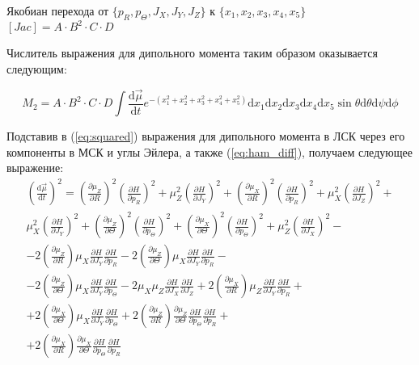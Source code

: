 Якобиан перехода от $\{p_R,p_{\Theta},J_X, J_Y, J_Z  \}$ к $\{x_1, x_2, x_3, x_4, x_5 \}$ $[Jac]=A\cdot B^2 \cdot C \cdot D$

Числитель выражения для дипольного момента таким образом оказывается следующим:

\begin{equation}
\label{eq:mom_sphere}
M_2 =  A\cdot B^2 \cdot C \cdot D {\int \frac{\mathrm{d}\vec\mu}{\mathrm{d} t} e^{-(x_1^2+x_2^2+x_3^2+x_4^2+x_5^2)} \mathrm{d}x_1 \mathrm{d}x_2 \mathrm{d}x_3 \mathrm{d}x_4 \mathrm{d}x_5  \sin\theta \mathrm{d}\theta \mathrm{d}\psi \mathrm{d}\phi}
\end{equation}

Подставив в (\ref{eq:squared}) выражения для дипольного момента в ЛСК через его компоненты в МСК и углы Эйлера, а также (\ref{eq:ham_diff}), получаем следующее выражение:
\begin{equation*}
\begin{aligned}
\left(\frac{\mathrm{d}\vec\mu}{\mathrm{d} t}\right)^2=\left( \frac{\partial \mu_Z}{\partial R}  \right)^2\left( \frac{\partial H}{\partial p_R}  \right)^2 +
\mu_Z^2\left( \frac{\partial H}{\partial J_Y}  \right)^2 +
\left( \frac{\partial \mu_X}{\partial R}  \right)^2\left( \frac{\partial H}{\partial p_R}  \right)^2 +
\mu_X^2\left( \frac{\partial H}{\partial J_Z}  \right)^2 + \\
\mu_X^2\left( \frac{\partial H}{\partial J_Y}  \right)^2 + 
 \left( \frac{\partial \mu_Z}{\partial \Theta}  \right)^2\left( \frac{\partial H}{\partial p_{\Theta}}  \right)^2 +
\left( \frac{\partial \mu_X}{\partial \Theta}  \right)^2\left( \frac{\partial H}{\partial p_{\Theta}}  \right)^2 +
\mu_Z^2\left( \frac{\partial H}{\partial J_X}  \right)^2 - \\
- 2\left( \frac{\partial \mu_Z}{\partial R}  \right)\mu_X\frac{\partial H}{\partial J_Y}\frac{\partial H}{\partial p_R}  -
2\left( \frac{\partial \mu_Z}{\partial \Theta}  \right)\mu_X\frac{\partial H}{\partial J_Y}\frac{\partial H}{\partial p_R} - \\
- 2\left( \frac{\partial \mu_Z}{\partial \Theta}  \right)\mu_X\frac{\partial H}{\partial J_Y}\frac{\partial H}{\partial p_{\Theta}} -
2\mu_X\mu_Z\frac{\partial H}{\partial J_X}\frac{\partial H}{\partial J_Z} +
2\left( \frac{\partial \mu_X}{\partial R}  \right)\mu_Z\frac{\partial H}{\partial J_Y}\frac{\partial H}{\partial p_R} +  \\
+ 2\left( \frac{\partial \mu_X}{\partial \Theta}  \right)\mu_X\frac{\partial H}{\partial J_Y}\frac{\partial H}{\partial p_{\Theta}} +
2\left( \frac{\partial \mu_Z}{\partial R}  \right)\frac{\partial\mu_Z}{\partial \Theta}\frac{\partial H}{\partial p_{\Theta}}\frac{\partial H}{\partial p_R} + \\
+ 2\left( \frac{\partial \mu_X}{\partial R}  \right)\frac{\partial\mu_X}{\partial \Theta}\frac{\partial H}{\partial p_{\Theta}}\frac{\partial H}{\partial p_R}
\end{aligned}
\end{equation*}

